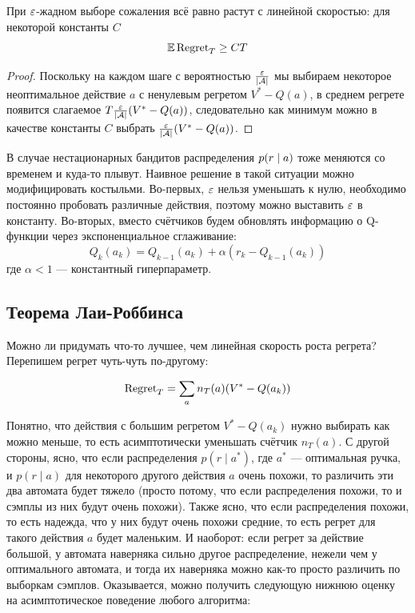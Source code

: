 \begin{proposition}
При $\varepsilon$-жадном выборе сожаления всё равно растут с линейной скоростью: для некоторой константы $C$
$$\mathbb{E} \operatorname{Regret}_T \ge CT$$
\begin{proof}
Поскольку на каждом шаге с вероятностью $\frac{\varepsilon}{|\mathcal{A}|}$ мы выбираем некоторое неоптимальное действие $a$ с ненулевым регретом $V^* - Q(a)$, в среднем регрете появится слагаемое $T \frac{\varepsilon}{|\mathcal{A}|} (V^* - Q(a))$, следовательно как минимум можно в качестве константы $C$ выбрать $\frac{\varepsilon}{|\mathcal{A}|} (V^* - Q(a))$.
\end{proof}
\end{proposition}

\begin{remark}
В случае нестационарных бандитов распределения $p(r \HM\mid a)$ тоже меняются со временем и куда-то плывут. Наивное решение в такой ситуации можно модифицировать костыльми. Во-первых, $\varepsilon$ нельзя уменьшать к нулю, необходимо постоянно пробовать различные действия, поэтому можно выставить $\varepsilon$ в константу. Во-вторых, вместо счётчиков будем обновлять информацию о Q-функции через экспоненциальное сглаживание:
$$Q_k(a_k) = Q_{k-1}(a_k) + \alpha \left( r_k - Q_{k-1}(a_k) \right)$$
где $\alpha < 1$ --- константный гиперпараметр.
\end{remark}

\subsection{Теорема Лаи-Роббинса}

Можно ли придумать что-то лучшее, чем линейная скорость роста регрета? Перепишем регрет чуть-чуть по-другому:

\begin{proposition}
\begin{equation}\label{regretalt}
\operatorname{Regret}_T = \sum_{a} n_T(a) (V^* - Q(a_k))
\end{equation}
\end{proposition}

Понятно, что действия с большим регретом $V^* - Q(a_k)$ нужно выбирать как можно меньше, то есть асимптотически уменьшать счётчик $n_T(a)$. С другой стороны, ясно, что если распределения $p(r \mid a^*)$, где $a^*$ --- оптимальная ручка, и $p(r \mid a)$ для некоторого другого действия $a$ очень похожи, то различить эти два автомата будет тяжело (просто потому, что если распределения похожи, то и сэмплы из них будут очень похожи). Также ясно, что если распределения похожи, то есть надежда, что у них будут очень похожи средние, то есть регрет для такого действия $a$ будет маленьким. И наоборот: если регрет за действие большой, у автомата наверняка сильно другое распределение, нежели чем у оптимального автомата, и тогда их наверняка можно как-то просто различить по выборкам сэмплов. Оказывается, можно получить следующую нижнюю оценку на асимптотическое поведение любого алгоритма:

